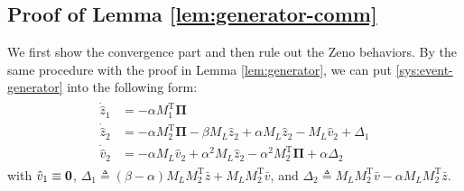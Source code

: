 \documentclass[sort&compress]{IEEEtran}
\renewcommand{\top}{{\mathrm{T}}}
\begin{document}
\subsection{Proof of Lemma \ref{lem:generator-comm}} 

We first show the convergence part and then rule out the Zeno behaviors.  By the same procedure with the proof in Lemma \ref{lem:generator}, we can put \eqref{sys:event-generator} into the following form:
\begin{align}\label{sys:osg-reduced-event}
	\begin{split}
		\dot{\hat z}_1&=-\alpha M_1^\top {\bm \Pi}\\
		\dot{\hat z}_2&=-\alpha M_2^\top {\bm \Pi}-\beta M_L \hat z_2 + \alpha M_L \hat z_2-M_L\hat v_2+\Delta_1\\
		\dot{\hat v}_2&=-\alpha M_L {\hat v}_2+\alpha^2 M_L \hat z_2-\alpha^2 M_2^\top {\bm \Pi} + \alpha \Delta_2
	\end{split}
\end{align}
with $\hat v_1\equiv {\bf 0}$, $\Delta_1\triangleq (\beta-\alpha) M_L M_2^\top \bar z+M_LM_2^\top \bar v$, and $\Delta_2\triangleq M_LM_2^\top \bar v -\alpha M_LM_2^\top \bar z$. 
\end{document}
